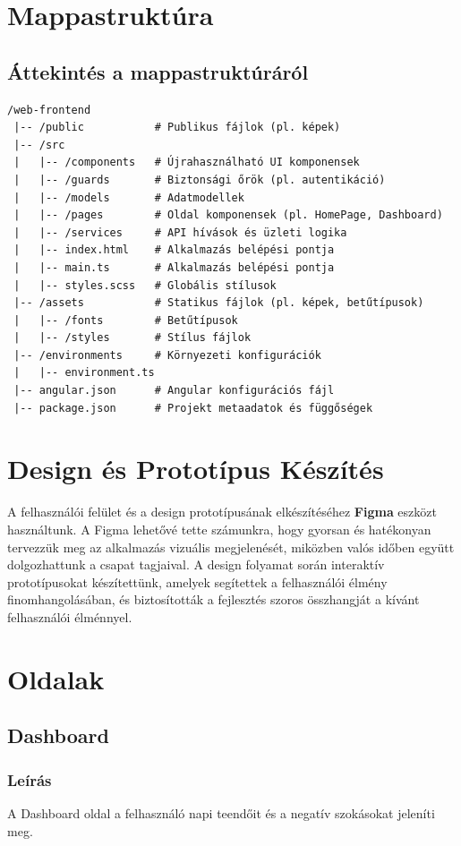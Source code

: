 \documentclass[12pt]{report}
\begin{document}
\newpage
\section{Mappastruktúra}
\subsection{Áttekintés a mappastruktúráról}
\begin{verbatim}
/web-frontend
 |-- /public           # Publikus fájlok (pl. képek)
 |-- /src             
 |   |-- /components   # Újrahasználható UI komponensek
 |   |-- /guards       # Biztonsági őrök (pl. autentikáció)
 |   |-- /models       # Adatmodellek
 |   |-- /pages        # Oldal komponensek (pl. HomePage, Dashboard)
 |   |-- /services     # API hívások és üzleti logika
 |   |-- index.html    # Alkalmazás belépési pontja
 |   |-- main.ts       # Alkalmazás belépési pontja
 |   |-- styles.scss   # Globális stílusok
 |-- /assets           # Statikus fájlok (pl. képek, betűtípusok)
 |   |-- /fonts        # Betűtípusok
 |   |-- /styles       # Stílus fájlok
 |-- /environments     # Környezeti konfigurációk
 |   |-- environment.ts
 |-- angular.json      # Angular konfigurációs fájl
 |-- package.json      # Projekt metaadatok és függőségek
\end{verbatim}

\section{Design és Prototípus Készítés}

A felhasználói felület és a design prototípusának elkészítéséhez \textbf{Figma} eszközt használtunk. A Figma lehetővé tette számunkra, hogy gyorsan és hatékonyan tervezzük meg az alkalmazás vizuális megjelenését, miközben valós időben együtt dolgozhattunk a csapat tagjaival. A design folyamat során interaktív prototípusokat készítettünk, amelyek segítettek a felhasználói élmény finomhangolásában, és biztosították a fejlesztés szoros összhangját a kívánt felhasználói élménnyel.

\section{Oldalak}
\subsection{Dashboard}

\subsubsection{Leírás}
A Dashboard oldal a felhasználó napi teendőit és a negatív szokásokat jeleníti meg.
\end{document}

